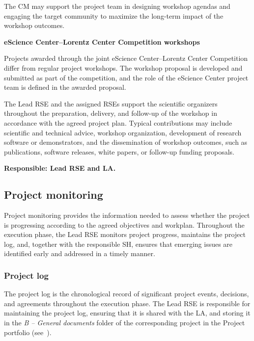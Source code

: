 The CM may support the project team in designing workshop agendas and engaging the target community to maximize the 
long-term impact of the workshop outcomes.

\medskip
\noindent\textbf{eScience Center--Lorentz Center Competition workshops}\par
\smallskip
Projects awarded through the joint eScience Center--Lorentz Center Competition differ from regular project workshops.
The workshop proposal is developed and submitted as part of the competition, and the role of the eScience Center project
team is defined in the awarded proposal.

The Lead RSE and the assigned RSEs support the scientific organizers throughout the preparation, delivery, and follow-up
of the workshop in accordance with the agreed project plan. Typical contributions may include scientific and technical
advice, workshop organization, development of research software or demonstrators, and the dissemination of workshop
outcomes, such as publications, software releases, white papers, or follow-up funding proposals.

\textbf{Responsible: Lead RSE and LA.}

\subsection{Project monitoring}
\label{sec:exec:monitoring}
Project monitoring provides the information needed to assess whether the project is progressing according to the agreed 
objectives and workplan. Throughout the execution phase, the Lead RSE monitors project progress, maintains the project 
log, and, together with the responsible SH, ensures that emerging issues are identified early and addressed in a timely 
manner.

\subsubsection{Project log}
\label{sec:exec:log}
The project log is the chronological record of significant project events, decisions, and agreements throughout the
execution phase. The Lead RSE is responsible for maintaining the project log, ensuring that it is shared with the LA, 
and storing it in the \textit{B -- General documents} folder of the corresponding project in the Project portfolio 
(see~\cite{proj-portfolio}).

